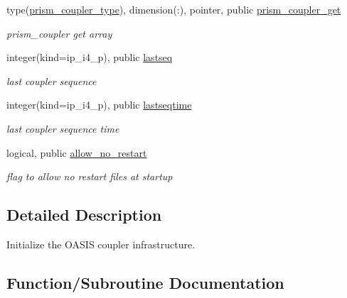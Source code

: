 \begin{DoxyCompactItemize}
type(\hyperlink{structmod__oasis__coupler_1_1prism__coupler__type}{prism\+\_\+coupler\+\_\+type}), dimension(\+:), pointer, public \hyperlink{namespacemod__oasis__coupler_a96df3ef2ec1b53597bb9beca43fe8349}{prism\+\_\+coupler\+\_\+get}
\begin{DoxyCompactList}\small\item\em prism\+\_\+coupler get array \end{DoxyCompactList}\item 
integer(kind=ip\+\_\+i4\+\_\+p), public \hyperlink{namespacemod__oasis__coupler_a0cb9b8a96c10385d38fa244d920c7eaf}{lastseq}
\begin{DoxyCompactList}\small\item\em last coupler sequence \end{DoxyCompactList}\item 
integer(kind=ip\+\_\+i4\+\_\+p), public \hyperlink{namespacemod__oasis__coupler_a47f4727f94719892d837f6a1545d3d08}{lastseqtime}
\begin{DoxyCompactList}\small\item\em last coupler sequence time \end{DoxyCompactList}\item 
logical, public \hyperlink{namespacemod__oasis__coupler_ab494fbbb8065f3a006892828f288e44a}{allow\+\_\+no\+\_\+restart}
\begin{DoxyCompactList}\small\item\em flag to allow no restart files at startup \end{DoxyCompactList}\end{DoxyCompactItemize}


\subsection{Detailed Description}
Initialize the O\+A\+S\+IS coupler infrastructure. 

\subsection{Function/\+Subroutine Documentation}
\mbox{\label{namespacemod__oasis__coupler_a773e323d2275aff227e05e98ce97def1}} 
